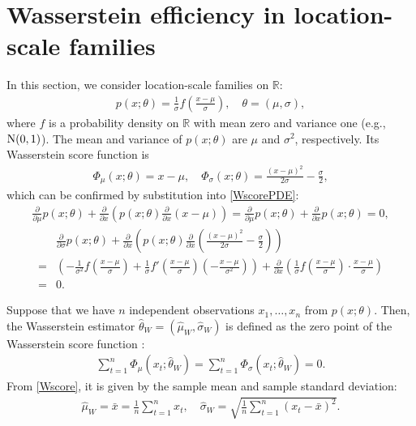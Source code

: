 \documentclass[11pt, a4paper]{article}
\begin{document}
\section{Wasserstein efficiency in location-scale families}\label{location-scale}
In this section, we consider location-scale families on $\mathbb{R}$:
\begin{align}\label{lcf}
	p(x; \theta) = \frac{1}{\sigma}f\left(\frac{x-\mu}{\sigma}\right), \quad \theta=(\mu,\sigma),
\end{align}
where $f$ is a probability density on $\mathbb{R}$ with mean zero and variance one (e.g., ${\rm N}(0,1)$). 
The mean and variance of $p(x; \theta)$ are $\mu$ and $\sigma^2$, respectively.
Its Wasserstein score function is 
\begin{align}\label{Wscore}
	\Phi_{\mu}(x;\theta) = x-\mu, \quad \Phi_{\sigma}(x;\theta) = \frac{(x-\mu)^2}{2\sigma} - \frac{\sigma}{2},
\end{align}
which can be confirmed by substitution into \eqref{WscorePDE}:
\begin{align*}
	\frac{\partial}{\partial \mu} p(x;\theta) + \frac{\partial}{\partial x} \left( p(x;\theta) \frac{\partial}{\partial x} (x-\mu) \right) = \frac{\partial}{\partial \mu} p(x;\theta) + \frac{\partial}{\partial x} p(x;\theta) = 0,
\end{align*}
\begin{align*}
	& \frac{\partial}{\partial \sigma} p(x;\theta) + \frac{\partial}{\partial x} \left( p(x;\theta) \frac{\partial}{\partial x} \left( \frac{(x-\mu)^2}{2\sigma} - \frac{\sigma}{2} \right) \right) \\
	= & \left( -\frac{1}{\sigma^2} f\left(\frac{x-\mu}{\sigma}\right) + \frac{1}{\sigma} f'\left(\frac{x-\mu}{\sigma}\right) \left(-\frac{x-\mu}{\sigma^2}\right) \right) + \frac{\partial}{\partial x} \left( \frac{1}{\sigma} f \left(\frac{x-\mu}{\sigma}\right) \cdot \frac{x-\mu}{\sigma} \right) \\
	=& 0.
\end{align*}

Suppose that we have $n$ independent observations $x_1,\dots,x_n$ from $p(x;\theta)$.	
Then, the Wasserstein estimator $\hat{\theta}_W=(\hat{\mu}_W,\hat{\sigma}_W)$ is defined as the zero point of the Wasserstein score function \citep{WIM}:
\begin{align*}
	\sum_{t=1}^n \Phi_{\mu}(x_t; \hat{\theta}_W) = \sum_{t=1}^n \Phi_{\sigma}(x_t; \hat{\theta}_W) = 0.
\end{align*}	
From \eqref{Wscore}, it is given by the sample mean and sample standard deviation: 
\begin{align}\label{West}
	\hat{\mu}_W = \bar{x} = \frac{1}{n}\sum_{t=1}^n x_t,\quad  \hat{\sigma}_W = \sqrt{\frac{1}{n}\sum_{t=1}^n (x_t-\bar{x})^2}.
\end{align}
\end{document}
